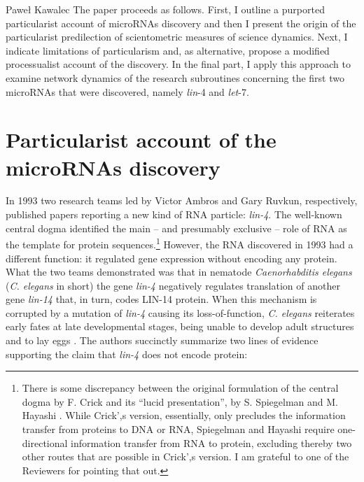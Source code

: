 \begin{artengenv}{Paweł Kawalec}
The paper proceeds as follows. First, I outline a purported particularist account of microRNAs discovery and then I present the origin of the particularist predilection of scientometric measures of science dynamics. Next, I indicate limitations of particularism and, as alternative, propose a modified processualist account of the discovery. In the final part, I apply this approach to examine network dynamics of the research subroutines concerning the first two microRNAs that were discovered, namely \textit{lin}-4 and \textit{let}-7.

\section{Particularist account of the microRNAs discovery}
In 1993 two research teams led by Victor Ambros and Gary Ruvkun, respectively, published papers reporting a new kind of RNA particle: \textit{lin-4}. The well-known central dogma identified the main -- and presumably exclusive -- role of RNA as the template for protein sequences.\footnote{There is some discrepancy between the original formulation of the central dogma by F. Crick
\parencite*[][]{crick_central_1970} %
 and its ``lucid presentation'', 
\parencite[][pp.297–298]{watson_molecular_1965} %
 by S. Spiegelman and M. Hayashi 
\parencite*[][]{spiegelman_present_1963}. %
 While Crick',s version, essentially, only precludes the information transfer from proteins to DNA or RNA, Spiegelman and Hayashi require one-directional information transfer from RNA to protein, excluding thereby two other routes that are possible in Crick',s version. I am grateful to one of the Reviewers for pointing that out.} However, the RNA discovered in 1993 had a different function: it regulated gene expression without encoding any protein. What the two teams demonstrated was that in nematode \textit{Caenorhabditis elegans} (\textit{C. elegans} in short) the gene \textit{lin-4} negatively regulates translation of another gene \textit{lin-14} that, in turn, codes LIN-14 protein. When this mechanism is corrupted by a mutation of \textit{lin-4} causing its loss-of-function, \textit{C. elegans} reiterates early fates at late developmental stages, being unable to develop adult structures and to lay eggs 
\parencite[][]{lee_c_1993}. %
 The authors succinctly summarize two lines of evidence supporting the claim that \textit{lin-4} does not encode protein:


\end{artengenv}
